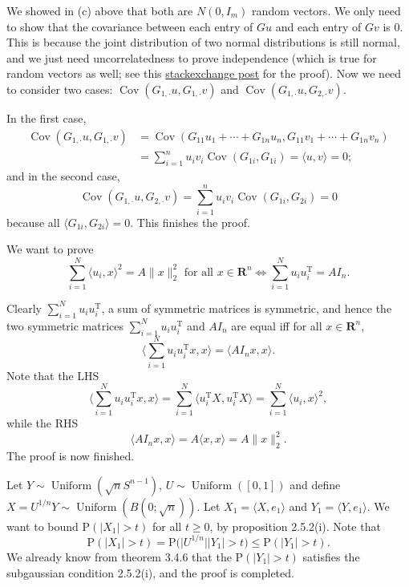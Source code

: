 \documentclass[11pt]{article}
\newcommand{\la}{\langle}
\newcommand{\ra}{\rangle}
\newcommand{\R}{\mathbf{R}}
\newcommand{\inp}[2]{\langle #1, #2 \rangle}
\newcommand{\nm}[1]{\lVert #1 \rVert}
\newcommand{\abs}[1]{\lvert #1 \rvert}
\newcommand{\trp}{\mathrm T}
\renewcommand{\Pr}{\mathrm{P}}
\newcommand{\Cov}{\operatorname{Cov}}
\theoremstyle{plain}
\theoremstyle{definition}
\theoremstyle{remark}
\theoremstyle{definition}
\newenvironment{mansol}[1]{%
  \renewcommand\themansolinner{#1}%
  \mansolinner
}{\endmansolinner}
\begin{document}
\begin{mansol}{3.3.6}
We showed in (c) above that both are $N(0,I_m)$ random vectors. We only need to show that the covariance between each entry of $Gu$ and each entry of $Gv$ is 0. This is because the joint distribution of two normal distributions is still normal, and we just need uncorrelatedness to prove independence (which is true for random vectors as well; see this \href{https://stats.stackexchange.com/questions/375217/definition-of-independence-of-two-random-vectors-and-how-to-show-it-in-the-joint}{stackexchange post} for the proof). Now we need to consider two cases: $\Cov(G_{1,\cdot}u,G_{1,\cdot}v)$ and $\Cov(G_{1,\cdot}u,G_{2,\cdot}v)$.

In the first case, \begin{align*}
\Cov(G_{1,\cdot}u,G_{1,\cdot}v) & = \Cov(G_{11}u_1 + \cdots + G_{1n}u_n, G_{11}v_1 + \cdots + G_{1n}v_n) \\ 
& = \sum_{i=1}^n u_i v_i \Cov(G_{1i},G_{1i}) = \inp{u}{v} = 0;
\end{align*}
and in the second case, \[
\Cov(G_{1,\cdot}u,G_{2,\cdot}v) = \sum_{i=1}^n u_i v_i \Cov(G_{1i},G_{2i}) = 0
\] because all $\inp{G_{1i}}{G_{2i}} = 0$. This finishes the proof.
\end{mansol}

\begin{mansol}{3.3.9}
    We want to prove \[\sum_{i=1}^N \inp{u_i}{x}^2 = A\nm{x}_2^2 \text{ for all }x \in \R^n \iff \sum_{i=1}^N u_i u_i^\trp = A I_n.\]

    Clearly $\sum_{i=1}^N u_i u_i^\trp$, a sum of symmetric matrices is symmetric, and hence the two symmetric matrices $\sum_{i=1}^N u_i u_i^\trp$ and $AI_n$ are equal iff for all $x \in \R^n$, \[
    \Big\la\sum_{i=1}^N u_i u_i^\trp x, x\Big\ra = \inp{A I_n x}{x}.
    \]
    Note that the LHS \[
     \Big\la\sum_{i=1}^N u_i u_i^\trp x, x\Big\ra = \sum_{i=1}^N \inp{u_i^\trp X}{u_i^\trp X} = \sum_{i=1}^N \inp{u_i}{x}^2,
    \]
    while the RHS \[
    \inp{A I_n x}{x} = A\inp{x}{x} = A \nm{x}_2^2.
    \]
    The proof is now finished.
\end{mansol}

\begin{mansol}{3.4.7}
Let $Y \sim \operatorname{Uniform}(\sqrt{n} S^{n-1})$, $U \sim \operatorname{Uniform}([0,1])$ and define $X = U^{1/n}Y \sim \operatorname{Uniform}(B(0;\sqrt{n}))$. Let $X_1 = \inp{X}{e_1}$ and $Y_1 = \inp{Y}{e_1}$. We want to bound $\Pr(\abs{X_1} > t)$ for all $t \geq 0$, by proposition 2.5.2(i). Note that
\[
\Pr(\abs{X_1} > t) = \Pr\bigl(\big\lvert U^{1/n} \big\rvert \abs{Y_1} > t\bigr) \leq \Pr(\abs{Y_1} > t).
\]
We already know from theorem 3.4.6 that the $\Pr(\abs{Y_1} > t)$ satisfies the subgaussian condition 2.5.2(i), and the proof is completed.
\end{mansol}
\end{document}
